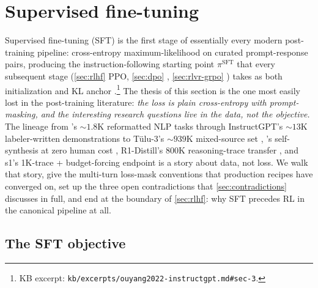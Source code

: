 
\section{Supervised fine-tuning}
\label{sec:sft}

Supervised fine-tuning (SFT) is the first stage of essentially every
modern post-training pipeline: cross-entropy maximum-likelihood on
curated prompt-response pairs, producing the instruction-following
starting point $\pi^{\mathrm{SFT}}$ that every subsequent stage
(\cref{sec:rlhf} PPO, \cref{sec:dpo} , \cref{sec:rlvr-grpo} )
takes as both initialization and KL anchor
\citep[\S 3]{ouyang2022-instructgpt}.\footnote{KB excerpt:
\texttt{kb/excerpts/ouyang2022-instructgpt.md\#sec-3}.} The thesis of
this section is the one most easily lost in the post-training
literature: \emph{the loss is plain cross-entropy with prompt-masking,
and the interesting research questions live in the data, not the
objective.} The lineage from 's $\sim\!1.8$K reformatted NLP tasks
\citep{wei2021-flan,chung2022-flan-t5} through InstructGPT's $\sim\!13$K
labeler-written demonstrations \citep[\S 3]{ouyang2022-instructgpt} to
T\"ulu-3's $\sim\!939$K mixed-source set \citep{tulu3}, 's
self-synthesis at zero human cost \citep{magpie-2024}, R1-Distill's
$800$K reasoning-trace transfer \citep[\S 4]{deepseek-r1}, and s1's
1K-trace + budget-forcing endpoint \citep{s1-2025} is a story about
data, not loss. We walk that story, give the multi-turn loss-mask
conventions that production recipes have converged on, set up the
three open contradictions that \cref{sec:contradictions} discusses in
full, and end at the boundary of \cref{sec:rlhf}: why SFT precedes RL
in the canonical pipeline at all.

\subsection{The SFT objective}
\label{sec:sft-objective}

